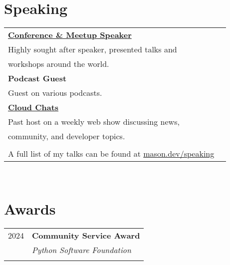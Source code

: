 \documentclass[10pt]{article} %
\newcommand\tab[1][1cm]{\hspace*{#1}}
\begin{document}
\begin{minipage}[t]{0.44\textwidth} %
\vspace{0pt} %


\section{Speaking} 

\begin{tabular}{ll}

\textbf{\href{https://mason.dev/speaking}{Conference \& Meetup Speaker}} \\
\tab Highly sought after speaker, presented talks and   \\ 
\tab workshops around the world. \\

\textbf{Podcast Guest} \\
\tab Guest on various podcasts. \\

\textbf{\href{https://www.digitalocean.com/community/pages/cloud-chats}{Cloud Chats}} \\
\tab Past host on a weekly web show discussing news, \\
\tab community, and developer topics.\\
\\

A full list of my talks can be found at \href{https://mason.dev/speaking}{mason.dev/speaking}\\

\end{tabular}\\


\section{Awards} 

\begin{tabular}{rl}

2024     & \textbf{Community Service Award}\\
    & \textit{Python Software Foundation} \\\\    


\end{tabular}
\end{minipage}
\end{document}
